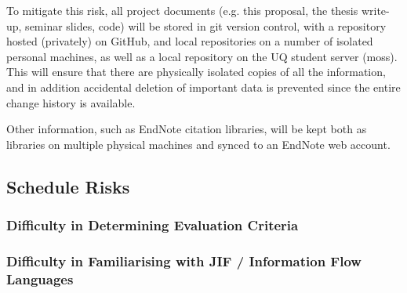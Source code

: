 To mitigate this risk, all project documents (e.g. this proposal, the thesis write-up, seminar slides, code) will be stored in git version control, with a repository hosted (privately) on GitHub, and local repositories on a number of isolated personal machines, as well as a local repository on the UQ student server (moss). This will ensure that there are physically isolated copies of all the information, and in addition accidental deletion of important data is prevented since the entire change history is available.

Other information, such as EndNote citation libraries, will be kept both as libraries on multiple physical machines and synced to an EndNote web account.

\subsection{Schedule Risks}

\subsubsection{Difficulty in Determining Evaluation Criteria}

\subsubsection{Difficulty in Familiarising with JIF / Information Flow Languages}